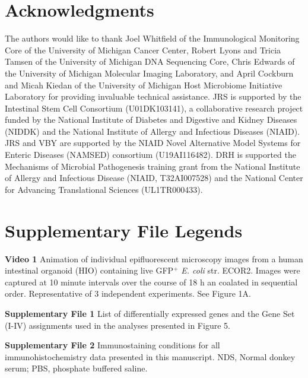 \documentclass[9pt,lineo]{elife}
\begin{document}
\section*{{\bfseries\sffamily } Acknowledgments}
\label{sec:orgheadline28}
The authors would like to thank Joel Whitfield of the Immunological Monitoring Core of the University of Michigan Cancer Center, Robert Lyons and Tricia Tamsen of the University of Michigan DNA Sequencing Core, Chris Edwards of the University of Michigan Molecular Imaging Laboratory, and April Cockburn and Micah Kiedan of the University of Michigan Host Microbiome Initiative Laboratory for providing invaluable technical assistance.
JRS is supported by the Intestinal Stem Cell Consortium (U01DK103141), a collaborative research project funded by the National Institute of Diabetes and Digestive and Kidney Diseases (NIDDK) and the National Institute of Allergy and Infectious Diseases (NIAID). JRS and VBY are supported by the NIAID Novel Alternative Model Systems for Enteric Diseases (NAMSED) consortium (U19AI116482). DRH is supported the Mechanisms of Microbial Pathogenesis training grant from the National Institute of Allergy and Infectious Disease (NIAID, T32AI007528) and the National Center for Advancing Translational Sciences (UL1TR000433). 

\nocite{*}
\section*{{\bfseries\sffamily } Supplementary File Legends}
\label{sec:orgheadline29}
\begin{flushleft}
\textbf{Video 1} Animation of individual epifluorescent microscopy images from a human intestinal organoid (HIO) containing live GFP$^{+}$ \textit{E. coli} str. ECOR2.  Images were captured at 10 minute intervals over the course of 18 h an coalated in sequential order. Representative of 3 independent experiments. See Figure 1A.
\newline
\end{flushleft}

\begin{flushleft}
\textbf{Supplementary File 1} List of differentially expressed genes and the Gene Set (I-IV) assignments used in the analyses presented in Figure 5.
\newline
\end{flushleft}

\begin{flushleft}
\textbf{Supplementary File 2} Immunostaining conditions for all immunohistochemistry data presented in this manuscript. NDS, Normal donkey serum; PBS, phosphate buffered saline.
\end{flushleft}
\end{document}
